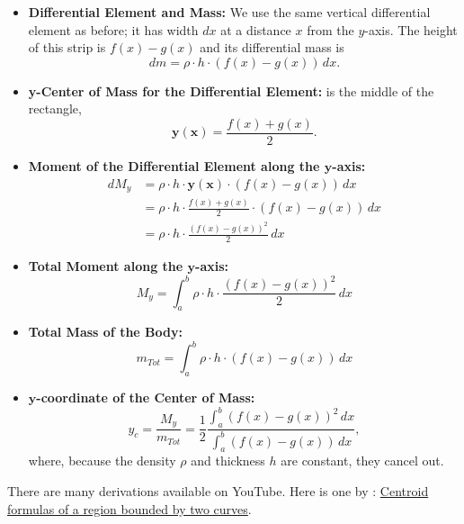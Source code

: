 \begin{itemize}
    \item \textbf{Differential Element and Mass:} We use the same vertical differential element as before; it has width \( dx \) at a distance \( x \) from the $y$-axis. The height of this strip is \( f(x) - g(x) \) and its differential mass is   $$ dm = \rho \cdot h \cdot (f(x) - g(x)) \,  dx.$$

     \item \textbf{y-Center of Mass for the Differential Element:} is the middle of the rectangle, 
     $$ \bm{y(x)} = \frac{f(x) + g(x)}{2}.$$

    \item \textbf{Moment of the Differential Element along the $\bm{y}$-axis:} 
\begin{align*}
    dM_y &= \rho \cdot h \cdot \bm{y(x)} \cdot (f(x) -g(x)) \, dx \\[1em]
    &= \rho \cdot h \cdot \frac{f(x)+g(x)}{2} \cdot (f(x) -g(x)) \, dx \\[1em]
    &= \rho \cdot h \cdot \frac{\left(f(x)-g(x)\right)^2}{2} \, dx
\end{align*} 


    \item  \textbf{Total Moment along the $\bm{y}$-axis:}
\[ M_y = \int_{a}^{b} \rho \cdot h \cdot \frac{\left(f(x)-g(x)\right)^2}{2} \, dx \]

\item \textbf{Total Mass of the Body:}
\[ m_{Tot} = \int_{a}^{b} \rho \cdot h \cdot (f(x) - g(x))  \, dx \]


    \item \textbf{$\bm{y}$-coordinate of the Center of Mass:}
$$
    y_c = \frac{M_y}{m_{Tot}} = \frac{ 1}{2} \frac{\int_{a}^{b}  \left(f(x)-g(x)\right)^2\, dx}{\int_{a}^{b} (f(x) - g(x)) \, dx},
$$
where, because the density $\rho$ and thickness $h$ are constant, they cancel out.

\end{itemize}


\bigskip

There are many derivations available on YouTube. Here is one by \bprp: \href{https://youtu.be/KGYzjQczpHE}{Centroid formulas of a region bounded by two curves}.





\bigskip

